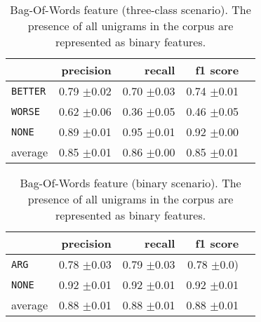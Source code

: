 	
	\begin{table}[htbp] 
		\centering 
		\caption{Bag-Of-Words feature (three-class scenario). The presence of all unigrams in the corpus are represented as binary features.} 
		\label{  }
		\begin{tabular}{@{}lrrrr@{}}
			\toprule
			        & precision                & recall                   & f1 score                 \\ \midrule 
			\texttt{BETTER}	&	 0.79 \scriptsize{$\pm$0.02} &	 0.70 \scriptsize{$\pm$0.03} &	 0.74 \scriptsize{$\pm$0.01}  \\ 
\texttt{WORSE}	&	 0.62 \scriptsize{$\pm$0.06} &	 0.36 \scriptsize{$\pm$0.05} &	 0.46 \scriptsize{$\pm$0.05}  \\ 
\texttt{NONE}	&	 0.89 \scriptsize{$\pm$0.01} &	 0.95 \scriptsize{$\pm$0.01} &	 0.92 \scriptsize{$\pm$0.00}  \\ 
average	&	 0.85 \scriptsize{$\pm$0.01} &	 0.86 \scriptsize{$\pm$0.00} &	 0.85 \scriptsize{$\pm$0.01}  \\ 			\bottomrule
		\end{tabular}
	\end{table}
	
	
	\begin{table}[htbp] 
		\centering 
		\caption{Bag-Of-Words feature (binary scenario). The presence of all unigrams in the corpus are represented as binary features.} 

		\begin{tabular}{@{}lrrrr@{}}
			\toprule
			        & precision                & recall                   & f1 score                 \\ \midrule 
	\texttt{ARG}	&	 0.78 \scriptsize{$\pm$0.03} &	 0.79 \scriptsize{$\pm$0.03} &	 0.78 \scriptsize{$\pm$0.0)}  \\ 
	\texttt{NONE}	&	 0.92 \scriptsize{$\pm$0.01} &	 0.92 \scriptsize{$\pm$0.01} &	 0.92 \scriptsize{$\pm$0.01}  \\ 
average	&	 0.88 \scriptsize{$\pm$0.01} &	 0.88 \scriptsize{$\pm$0.01} &	 0.88 \scriptsize{$\pm$0.01}  \\ 
			\bottomrule
		\end{tabular}
	\end{table}
	
